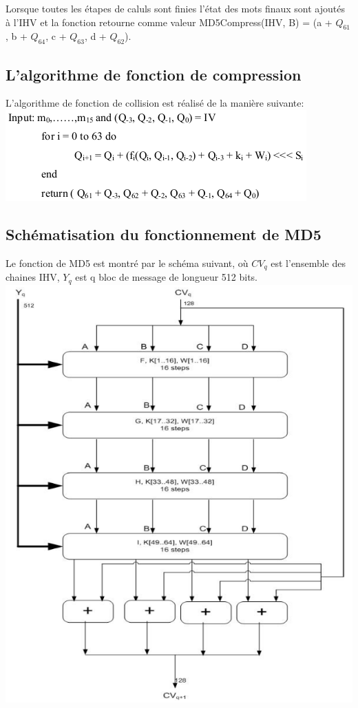 \documentclass[a4paper,11pt,french]{article}
\begin{document}
Lorsque toutes les étapes de caluls sont finies l'état des mots finaux sont ajoutés à l'IHV et la fonction retourne comme valeur MD5Compress(IHV, B) = (a + $Q_{61}$, b + $Q_{64}$, c + $Q_{63}$, d + $Q_{62}$).

\subsection{L'algorithme de fonction de compression}
L'algorithme de fonction de collision est réalisé de la manière suivante:\\

\includegraphics[scale=.61]{./pics/algocom.png}

\subsection{Schématisation du fonctionnement de MD5}
Le fonction de MD5 est montré par le schéma suivant, où $CV_{q}$ est l'ensemble des chaines IHV, $Y_{q}$ est q bloc de message de longueur 512 bits.\\

\includegraphics[scale=.61]{./pics/md5process.png}
\end{document}
